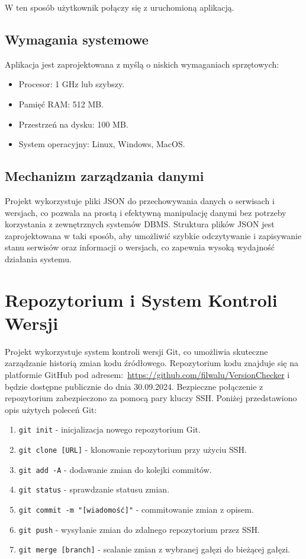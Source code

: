 \noindent W ten sposób użytkownik połączy się z uruchomioną aplikacją.


\subsection{Wymagania systemowe}

Aplikacja jest zaprojektowana z myślą o niskich wymaganiach sprzętowych:

\begin{itemize}
\item Procesor: 1 GHz lub szybszy.
\item Pamięć RAM: 512 MB.
\item Przestrzeń na dysku: 100 MB.
\item System operacyjny: Linux, Windows, MacOS.
\end{itemize}

\subsection{Mechanizm zarządzania danymi}

Projekt wykorzystuje pliki JSON do przechowywania danych o serwisach i wersjach, co pozwala na prostą i efektywną manipulację danymi bez potrzeby korzystania z zewnętrznych systemów DBMS. Struktura plików JSON jest zaprojektowana w taki sposób, aby umożliwić szybkie odczytywanie i zapisywanie stanu serwisów oraz informacji o wersjach, co zapewnia wysoką wydajność działania systemu.

\section{Repozytorium i System Kontroli Wersji}

Projekt wykorzystuje system kontroli wersji Git, co umożliwia skuteczne zarządzanie historią zmian kodu źródłowego. Repozytorium kodu znajduje się na platformie GitHub pod adresem:\ \url{https://github.com/filwalu/VersionChecker} i będzie dostępne publicznie do dnia 30.09.2024. Bezpieczne połączenie z repozytorium zabezpieczono za pomocą pary kluczy SSH. Poniżej przedstawiono opis użytych poleceń Git:

\begin{enumerate}
\item \texttt{git init} - inicjalizacja nowego repozytorium Git.
\item \texttt{git clone [URL]} - klonowanie repozytorium przy użyciu SSH.
\item \texttt{git add -A} - dodawanie zmian do kolejki commitów.
\item \texttt{git status} - sprawdzanie statusu zmian.
\item \texttt{git commit -m "[wiadomość]"} - commitowanie zmian z opisem.
\item \texttt{git push} - wysyłanie zmian do zdalnego repozytorium przez SSH.
\item \texttt{git merge [branch]} - scalanie zmian z wybranej gałęzi do bieżącej gałęzi.
\end{enumerate}

\clearpage